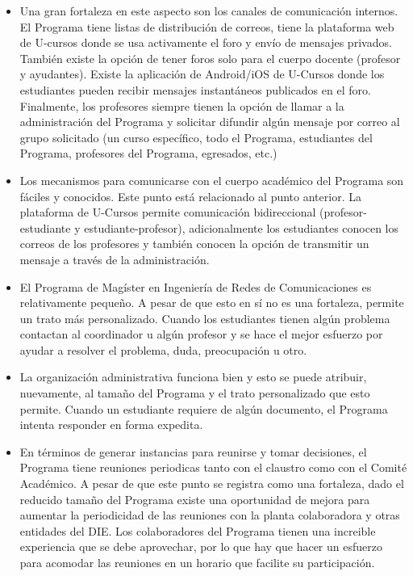 \begin{itemize}
\item Una gran fortaleza en este aspecto son los canales de comunicación internos. El Programa tiene listas de distribución de correos, 
tiene la plataforma web de U-cursos donde se usa activamente el foro y envío de mensajes privados. También existe la opción de tener foros 
solo para el cuerpo docente (profesor y ayudantes). Existe la aplicación de Android/iOS de U-Cursos donde los estudiantes pueden recibir
mensajes instantáneos publicados en el foro. Finalmente, los profesores siempre tienen la opción de llamar a la administración del Programa y 
solicitar difundir algún mensaje por correo al grupo solicitado (un curso específico, todo el Programa, estudiantes del Programa, 
profesores del Programa, egresados, etc.)
\item Los mecanismos para comunicarse con el cuerpo académico del Programa son fáciles y conocidos. Este punto está relacionado al punto anterior.
La plataforma de U-Cursos permite comunicación bidireccional (profesor-estudiante y estudiante-profesor), adicionalmente los estudiantes conocen
los correos de los profesores y también conocen la opción de transmitir un mensaje a través de la administración.
\item El Programa de Magíster en Ingeniería de Redes de Comunicaciones es relativamente pequeño. A pesar de que esto en sí no es una fortaleza, permite un trato más personalizado.
Cuando los estudiantes tienen algún problema contactan al coordinador u algún profesor y se hace el mejor esfuerzo por ayudar a resolver el 
problema, duda, preocupación u otro. 
\item La organización administrativa funciona bien y esto se puede atribuir, nuevamente, al tamaño del Programa y el trato personalizado 
que esto permite. Cuando un estudiante requiere de algún documento, el Programa intenta responder en forma expedita.
\item En términos de generar instancias para reunirse y tomar decisiones, el Programa tiene reuniones periodicas tanto con el claustro como 
con el Comité Académico. A pesar de que este punto se registra como una fortaleza, dado el reducido tamaño del Programa existe una 
oportunidad de mejora para aumentar la periodicidad de las reuniones con la planta colaboradora y otras entidades del DIE. Los colaboradores del Programa tienen 
una increible experiencia que se debe aprovechar, por lo que hay que hacer un esfuerzo para acomodar las reuniones en un horario que facilite 
su participación.
\end{itemize}


